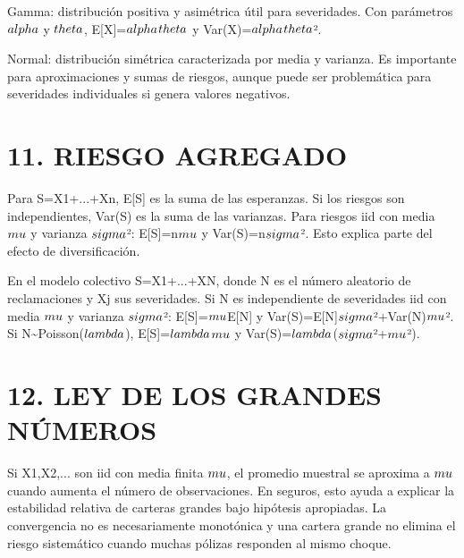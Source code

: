 \documentclass[11pt]{article}
\begin{document}
Gamma: distribución positiva y asimétrica útil para severidades. Con parámetros $\\alpha$ y $\\theta$, E[X]=$\\alpha$$\\theta$ y Var(X)=$\\alpha$$\\theta$².

Normal: distribución simétrica caracterizada por media y varianza. Es importante para aproximaciones y sumas de riesgos, aunque puede ser problemática para severidades individuales si genera valores negativos.

\section*{11. RIESGO AGREGADO}

Para S=X1+...+Xn, E[S] es la suma de las esperanzas. Si los riesgos son independientes, Var(S) es la suma de las varianzas. Para riesgos iid con media $\\mu$ y varianza $\\sigma$²: E[S]=n$\\mu$ y Var(S)=n$\\sigma$². Esto explica parte del efecto de diversificación.

En el modelo colectivo S=X1+...+XN, donde N es el número aleatorio de reclamaciones y Xj sus severidades. Si N es independiente de severidades iid con media $\\mu$ y varianza $\\sigma$²: E[S]=$\\mu$E[N] y Var(S)=E[N]$\\sigma$²+Var(N)$\\mu$². Si N\textasciitilde{}Poisson($\\lambda$), E[S]=$\\lambda$$\\mu$ y Var(S)=$\\lambda$($\\sigma$²+$\\mu$²).

\section*{12. LEY DE LOS GRANDES NÚMEROS}

Si X1,X2,... son iid con media finita $\\mu$, el promedio muestral se aproxima a $\\mu$ cuando aumenta el número de observaciones. En seguros, esto ayuda a explicar la estabilidad relativa de carteras grandes bajo hipótesis apropiadas. La convergencia no es necesariamente monotónica y una cartera grande no elimina el riesgo sistemático cuando muchas pólizas responden al mismo choque.
\end{document}
